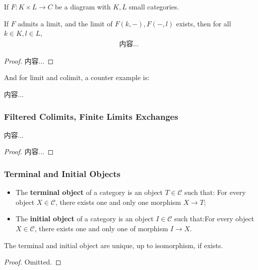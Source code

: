 \documentclass[Total.tex]{subfiles}
\begin{document}
					\begin{corollary}
						If $F:K\times L\rightarrow C$ be a diagram with $K,L$ small categories.
						
						If $F$ admits a limit, and the limit of $F(k,-),F(-,l)$ exists, then for all $k\in K, l\in L$,
						\begin{gather*}
							内容...
						\end{gather*}
					\end{corollary}
					\begin{proof}
						内容...
					\end{proof}
					
					And for limit and colimit, a counter example is:
					\begin{example}
						内容...
					\end{example}
					
					\subsubsection{Filtered Colimits, Finite Limits Exchanges}
					
					\begin{proposition}
						内容...
					\end{proposition}
					\begin{proof}
						内容...
					\end{proof}
					
				\subsubsection{Terminal and Initial Objects}
					\begin{Def}
						\begin{itemize}
							\item The \textbf{terminal object} of a category is an object $T\in \mathcal{C}$ such that: For every object $X\in \mathcal{C}$, there exists one and only one morphism $X\rightarrow T$;
							\item The \textbf{initial object} of a category is an object $I\in \mathcal{C}$ such that:For every object $X\in \mathcal{C}$, there exists one and only one of morphism $I\rightarrow X$.
						\end{itemize}
					\end{Def}
					
					\begin{proposition}
						The terminal and initial object are unique, up to isomorphism, if exists.
					\end{proposition}
					\begin{proof}
						Omitted.
					\end{proof}
					
\end{document}
